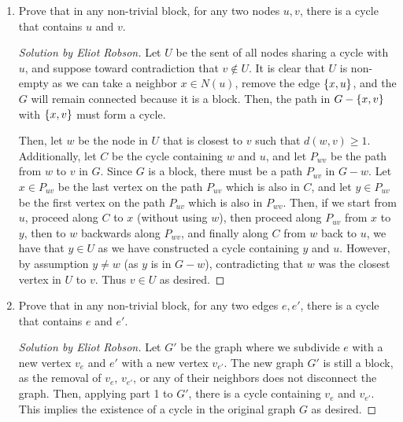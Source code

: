 \documentclass{article}
\newenvironment{solution}[1]{\begin{proof}[Solution by #1]}{\end{proof}}
\begin{document}
\begin{enumerate}
    \item Prove that in any non-trivial block, for any two nodes \(u,v\), there is a cycle that contains \(u\) and \(v\).
    
    \begin{solution}{Eliot Robson}
    	Let \(U\) be the sent of all nodes sharing a cycle with \(u\), and suppose toward contradiction that \(v \notin U\). It is clear that \(U\) is non-empty as we can take a neighbor \(x \in N(u)\), remove the edge \(\set{x,u}\), and the \(G\) will remain connected because it is a block. Then, the path in \(G - \set{x,v}\) with \(\set{x,v}\) must form a cycle.    	
    	
    	Then, let \(w\) be the node in \(U\) that is closest to \(v\) such that \(d(w,v) \geq 1\). Additionally, let \(C\) be the cycle containing \(w\) and \(u\), and let \(P_{wv}\) be the path from \(w\) to \(v\) in \(G\). Since \(G\) is a block, there must be a path \(P_{uv}\) in \(G - w\). Let \(x \in P_{uv}\) be the last vertex on the path \(P_{uv}\) which is also in \(C\), and let \(y \in P_{uv}\) be the first vertex on the path \(P_{uv}\) which is also in \(P_{wv}\). Then, if we start from \(u\), proceed along \(C\) to \(x\) (without using \(w\)), then proceed along \(P_{uv}\) from \(x\) to \(y\), then to \(w\) backwards along \(P_{wv}\), and finally along \(C\) from \(w\) back to \(u\), we have that \(y \in U\) as we have constructed a cycle containing \(y\) and \(u\). However, by assumption \(y \neq w\) (as \(y\) is in \(G - w\)), contradicting that \(w\) was the closest vertex in \(U\) to \(v\). Thus \(v \in U\) as desired.    	
    \end{solution}
    
    \item Prove that in any non-trivial block, for any two edges \(e,e'\), there is a cycle that contains \(e\) and \(e'\). %
    
    \begin{solution}{Eliot Robson}
        Let \(G'\) be the graph where we subdivide \(e\) with a new vertex \(v_{e}\) and \(e'\) with a new vertex \(v_{e'}\). The new graph \(G'\) is still a block, as the removal of \(v_{e}\), \(v_{e'}\), or any of their neighbors does not disconnect the graph. Then, applying part 1 to \(G'\), there is a cycle containing \(v_{e}\) and \(v_{e'}\). This implies the existence of a cycle in the original graph \(G\) as desired.
    \end{solution}
    
\end{enumerate}
\end{document}
